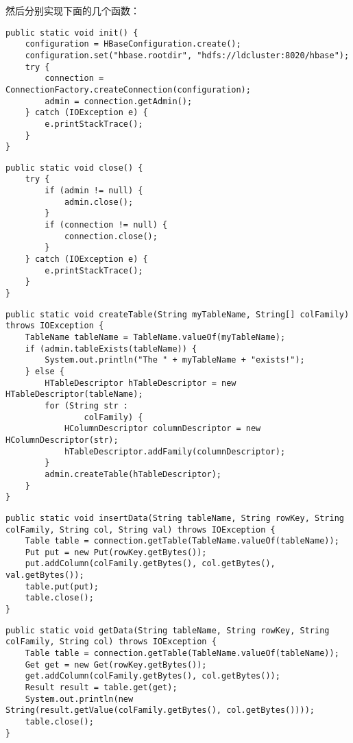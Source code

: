 然后分别实现下面的几个函数：

\begin{lstlisting}[style=customjava,title=init函数，用于初始化连接]
public static void init() {
	configuration = HBaseConfiguration.create();
	configuration.set("hbase.rootdir", "hdfs://ldcluster:8020/hbase");
	try {
		connection = ConnectionFactory.createConnection(configuration);
		admin = connection.getAdmin();
	} catch (IOException e) {
		e.printStackTrace();
	}
}
\end{lstlisting}

\begin{lstlisting}[style=customjava,title=close函数，用于结束断开连接]
public static void close() {
	try {
		if (admin != null) {
			admin.close();
		}
		if (connection != null) {
			connection.close();
		}
	} catch (IOException e) {
		e.printStackTrace();
	}
}
\end{lstlisting}

\begin{lstlisting}[style=customjava,title=createTable函数]
public static void createTable(String myTableName, String[] colFamily) throws IOException {
	TableName tableName = TableName.valueOf(myTableName);
	if (admin.tableExists(tableName)) {
		System.out.println("The " + myTableName + "exists!");
	} else {
		HTableDescriptor hTableDescriptor = new HTableDescriptor(tableName);
		for (String str :
				colFamily) {
			HColumnDescriptor columnDescriptor = new HColumnDescriptor(str);
			hTableDescriptor.addFamily(columnDescriptor);
		}
		admin.createTable(hTableDescriptor);
	}
}
\end{lstlisting}

\begin{lstlisting}[style=customjava,title=向表中插入数据的函数]
public static void insertData(String tableName, String rowKey, String colFamily, String col, String val) throws IOException {
	Table table = connection.getTable(TableName.valueOf(tableName));
	Put put = new Put(rowKey.getBytes());
	put.addColumn(colFamily.getBytes(), col.getBytes(), val.getBytes());
	table.put(put);
	table.close();
}
\end{lstlisting}

\begin{lstlisting}[style=customjava,title=从表中获取数据的函数]
public static void getData(String tableName, String rowKey, String colFamily, String col) throws IOException {
	Table table = connection.getTable(TableName.valueOf(tableName));
	Get get = new Get(rowKey.getBytes());
	get.addColumn(colFamily.getBytes(), col.getBytes());
	Result result = table.get(get);
	System.out.println(new String(result.getValue(colFamily.getBytes(), col.getBytes())));
	table.close();
}
\end{lstlisting}

